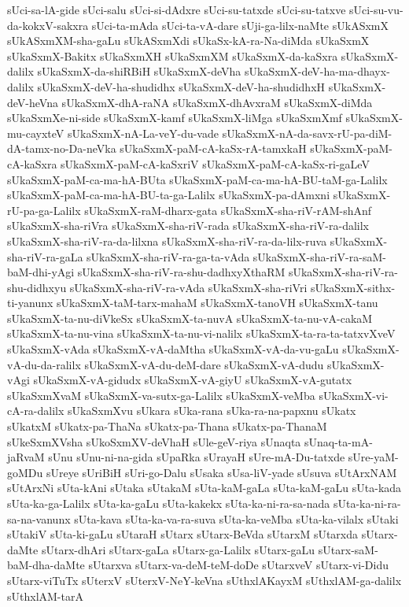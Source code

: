 {sUci-sa-lA-gide
sUci-salu
sUci-si-dAdxre
sUci-su-tatxde
sUci-su-tatxve
sUci-su-vu-da-kokxV-sakxra
sUci-ta-mAda
sUci-ta-vA-dare
sUji-ga-lilx-naMte
sUkASxmX
sUkASxmXM-sha-gaLu
sUkASxmXdi
sUkaSx-kA-ra-Na-diMda
sUkaSxmX
sUkaSxmX-Bakitx
sUkaSxmXH
sUkaSxmXM
sUkaSxmX-da-kaSxra
sUkaSxmX-dalilx
sUkaSxmX-da-shiRBiH
sUkaSxmX-deVha
sUkaSxmX-deV-ha-ma-dhayx-dalilx
sUkaSxmX-deV-ha-shudidhx
sUkaSxmX-deV-ha-shudidhxH
sUkaSxmX-deV-heVna
sUkaSxmX-dhA-raNA
sUkaSxmX-dhAvxraM
sUkaSxmX-diMda
sUkaSxmXe-ni-side
sUkaSxmX-kamf
sUkaSxmX-liMga
sUkaSxmXmf
sUkaSxmX-mu-cayxteV
sUkaSxmX-nA-La-veY-du-vade
sUkaSxmX-nA-da-savx-rU-pa-diM-dA-tamx-no-Da-neVka
sUkaSxmX-paM-cA-kaSx-rA-tamxkaH
sUkaSxmX-paM-cA-kaSxra
sUkaSxmX-paM-cA-kaSxriV
sUkaSxmX-paM-cA-kaSx-ri-gaLeV
sUkaSxmX-paM-ca-ma-hA-BUta
sUkaSxmX-paM-ca-ma-hA-BU-taM-ga-Lalilx
sUkaSxmX-paM-ca-ma-hA-BU-ta-ga-Lalilx
sUkaSxmX-pa-dAmxni
sUkaSxmX-rU-pa-ga-Lalilx
sUkaSxmX-raM-dharx-gata
sUkaSxmX-sha-riV-rAM-shAnf
sUkaSxmX-sha-riVra
sUkaSxmX-sha-riV-rada
sUkaSxmX-sha-riV-ra-dalilx
sUkaSxmX-sha-riV-ra-da-lilxna
sUkaSxmX-sha-riV-ra-da-lilx-ruva
sUkaSxmX-sha-riV-ra-gaLa
sUkaSxmX-sha-riV-ra-ga-ta-vAda
sUkaSxmX-sha-riV-ra-saM-baM-dhi-yAgi
sUkaSxmX-sha-riV-ra-shu-dadhxyXthaRM
sUkaSxmX-sha-riV-ra-shu-didhxyu
sUkaSxmX-sha-riV-ra-vAda
sUkaSxmX-sha-riVri
sUkaSxmX-sithx-ti-yanunx
sUkaSxmX-taM-tarx-mahaM
sUkaSxmX-tanoVH
sUkaSxmX-tanu
sUkaSxmX-ta-nu-diVkeSx
sUkaSxmX-ta-nuvA
sUkaSxmX-ta-nu-vA-cakaM
sUkaSxmX-ta-nu-vina
sUkaSxmX-ta-nu-vi-nalilx
sUkaSxmX-ta-ra-ta-tatxvXveV
sUkaSxmX-vAda
sUkaSxmX-vA-daMtha
sUkaSxmX-vA-da-vu-gaLu
sUkaSxmX-vA-du-da-ralilx
sUkaSxmX-vA-du-deM-dare
sUkaSxmX-vA-dudu
sUkaSxmX-vAgi
sUkaSxmX-vA-gidudx
sUkaSxmX-vA-giyU
sUkaSxmX-vA-gutatx
sUkaSxmXvaM
sUkaSxmX-va-sutx-ga-Lalilx
sUkaSxmX-veMba
sUkaSxmX-vi-cA-ra-dalilx
sUkaSxmXvu
sUkara
sUka-rana
sUka-ra-na-papxnu
sUkatx
sUkatxM
sUkatx-pa-ThaNa
sUkatx-pa-Thana
sUkatx-pa-ThanaM
sUkeSxmXVsha
sUkoSxmXV-deVhaH
sUle-geV-riya
sUnaqta
sUnaq-ta-mA-jaRvaM
sUnu
sUnu-ni-na-gida
sUpaRka
sUrayaH
sUre-mA-Du-tatxde
sUre-yaM-goMDu
sUreye
sUriBiH
sUri-go-Dalu
sUsaka
sUsa-liV-yade
sUsuva
sUtArxNAM
sUtArxNi
sUta-kAni
sUtaka
sUtakaM
sUta-kaM-gaLa
sUta-kaM-gaLu
sUta-kada
sUta-ka-ga-Lalilx
sUta-ka-gaLu
sUta-kakekx
sUta-ka-ni-ra-sa-nada
sUta-ka-ni-ra-sa-na-vanunx
sUta-kava
sUta-ka-va-ra-suva
sUta-ka-veMba
sUta-ka-vilalx
sUtaki
sUtakiV
sUta-ki-gaLu
sUtaraH
sUtarx
sUtarx-BeVda
sUtarxM
sUtarxda
sUtarx-daMte
sUtarx-dhAri
sUtarx-gaLa
sUtarx-ga-Lalilx
sUtarx-gaLu
sUtarx-saM-baM-dha-daMte
sUtarxva
sUtarx-va-deM-teM-doDe
sUtarxveV
sUtarx-vi-Didu
sUtarx-viTuTx
sUterxV
sUterxV-NeY-keVna
sUthxlAKayxM
sUthxlAM-ga-dalilx
sUthxlAM-tarA
}
